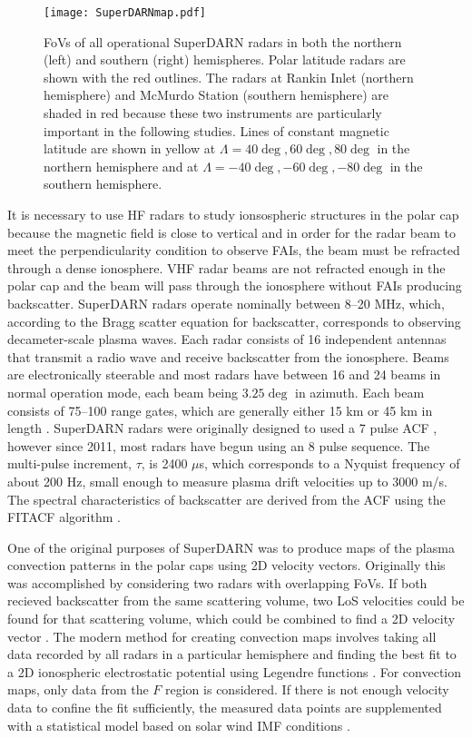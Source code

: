 \begin{figure}
	\texttt{[image: SuperDARNmap.pdf]}
	\caption{FoVs of all operational SuperDARN radars in both the northern (left) and southern (right) hemispheres.  Polar latitude radars are shown with the red outlines.  The radars at Rankin Inlet (northern hemisphere) and McMurdo Station (southern hemisphere) are shaded in red because these two instruments are particularly important in the following studies.  Lines of constant magnetic latitude are shown in yellow at \(\Lambda = 40\deg, 60\deg, 80\deg\) in the northern hemisphere and at \(\Lambda = -40\deg,-60\deg,-80\deg\) in the southern hemisphere.}
	\label{fig:superdarnmap}
\end{figure}

It is necessary to use HF radars to study ionsospheric structures in the polar cap because the magnetic field is close to vertical and in order for the radar beam to meet the perpendicularity condition to observe FAIs, the beam must be refracted through a dense ionosphere.  VHF radar beams are not refracted enough in the polar cap and the beam will pass through the ionosphere without FAIs producing backscatter.  SuperDARN radars operate nominally between 8--20 MHz, which, according to the Bragg scatter equation for backscatter, corresponds to observing decameter-scale plasma waves.  Each radar consists of 16 independent antennas that transmit a radio wave and receive backscatter from the ionosphere.  Beams are electronically steerable and most radars have between 16 and 24 beams in normal operation mode, each beam being \(3.25\deg\) in azimuth.  Each beam consists of 75--100 range gates, which are generally either 15 km or 45 km in length \citep{Chisham2007}.  SuperDARN radars were originally designed to used a 7 pulse ACF \citep{Farley1972,Greenwald1983,Greenwald1985}, however since 2011, most radars have begun using an 8 pulse sequence.   The multi-pulse increment, \(\tau\), is 2400 \(\mu\)s, which corresponds to a Nyquist frequency of about 200 Hz, small enough to measure plasma drift velocities up to 3000 m/s.  The spectral characteristics of backscatter are derived from the ACF using the FITACF algorithm \citep{Ponomarenko2006}.

One of the original purposes of SuperDARN was to produce maps of the plasma convection patterns in the polar caps using 2D velocity vectors.  Originally this was accomplished by considering two radars with overlapping FoVs.  If both recieved backscatter from the same scattering volume, two LoS velocities could be found for that scattering volume, which could be combined to find a 2D velocity vector \citep{Ruohoniemi1989}.  The modern method for creating convection maps involves taking all data recorded by all radars in a particular hemisphere and finding the best fit to a 2D ionospheric electrostatic potential using Legendre functions \citep{Ruohoniemi1998}.  For convection maps, only data from the \(F\) region is considered.  If there is not enough velocity data to confine the fit sufficiently, the measured data points are supplemented with a statistical model based on solar wind IMF conditions \citep{Ruohoniemi1995,Ruohoniemi2005}.

